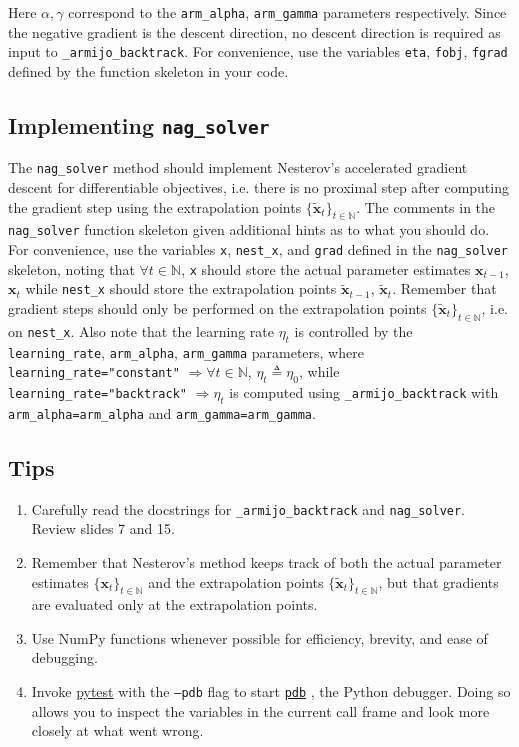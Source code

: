 \documentclass{article}
\numberwithin{equation}{section}
\newcommand{\pytest}{\href{https://docs.pytest.org/en/stable/}{pytest}}
\newcommand{\pdb}{%
    \href{https://docs.python.org/3/library/pdb.html}{\texttt{pdb}}%
}
\newcommand{\armijobacktrack}{\texttt{\_armijo\_backtrack}}
\newcommand{\nagsolver}{\texttt{nag\_solver}}
\begin{document}
Here $ \alpha, \gamma $ correspond to the \texttt{arm\_alpha},
\texttt{arm\_gamma} parameters respectively. Since the negative gradient is
the descent direction, no descent direction is required as input to
\armijobacktrack. For convenience, use the variables \texttt{eta},
\texttt{fobj}, \texttt{fgrad} defined by the function skeleton in your code.

\subsection{Implementing \nagsolver}

The \nagsolver{} method should implement Nesterov's accelerated gradient
descent for differentiable objectives, i.e. there is no proximal step after
computing the gradient step using the extrapolation points
$ \{\tilde{\mathbf{x}}_t\}_{t \in \mathbb{N}} $. The comments in the
\nagsolver{} function skeleton given additional hints as to what you should
do. For convenience, use the variables \texttt{x}, \texttt{nest\_x}, and
\texttt{grad} defined in the \nagsolver{} skeleton, noting that
$ \forall t \in \mathbb{N} $, \texttt{x} should store the actual parameter
estimates $ \mathbf{x}_{t - 1} $, $ \mathbf{x}_t $ while \texttt{nest\_x}
should store the extrapolation points $ \tilde{\mathbf{x}}_{t - 1} $,
$ \tilde{\mathbf{x}}_t $. Remember that gradient steps should only be
performed on the extrapolation points
$ \{\tilde{\mathbf{x}}_t\}_{t \in \mathbb{N}} $, i.e. on \texttt{nest\_x}.
Also note that the learning rate $ \eta_t $ is controlled by the
\texttt{learning\_rate}, \texttt{arm\_alpha}, \texttt{arm\_gamma} parameters,
where \texttt{learning\_rate="constant"} $ \Rightarrow \forall t \in
\mathbb{N} $, $ \eta_t \triangleq \eta_0 $, while
\texttt{learning\_rate="backtrack"} $ \Rightarrow \eta_t $ is computed using
\armijobacktrack{} with \texttt{arm\_alpha=arm\_alpha} and
\texttt{arm\_gamma=arm\_gamma}.

\subsection{Tips}

\begin{enumerate}
    \item
    Carefully read the docstrings for \armijobacktrack{} and \nagsolver.
    Review slides 7 and 15.

    \item
    Remember that Nesterov's method keeps track of both the actual parameter
    estimates $ \{\mathbf{x}_t\}_{t \in \mathbb{N}} $ and the extrapolation
    points $ \{\tilde{\mathbf{x}}_t\}_{t \in \mathbb{N}} $, but that gradients
    are evaluated only at the extrapolation points.

    \item
    Use NumPy functions whenever possible for efficiency, brevity, and ease
    of debugging.

    \item
    Invoke \pytest{} with the \texttt{--pdb} flag to start \pdb, the Python
    debugger. Doing so allows you to inspect the variables in the current call
    frame and look more closely at what went wrong.
\end{enumerate}
\end{document}
